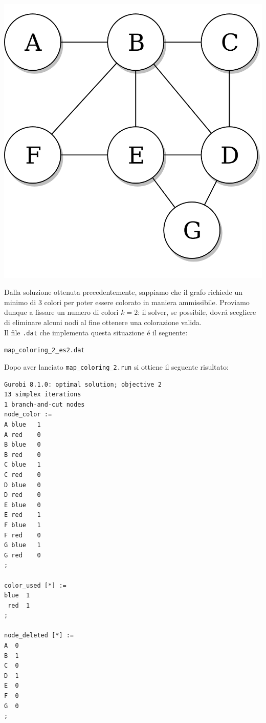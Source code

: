 \documentclass{article}
\begin{document}
\begin{center}
\includegraphics[scale=0.2]{non_complete_graph.png}
\end{center}

Dalla soluzione ottenuta precedentemente, sappiamo che il grafo richiede un minimo di 3 colori per poter essere colorato in maniera ammissibile. Proviamo dunque a fissare un numero di colori $k = 2$: il solver, se possibile, dovr\'a scegliere di eliminare alcuni nodi al fine ottenere una colorazione valida.\\

Il file \texttt{.dat} che implementa questa situazione \'e il seguente:

\vspace{5mm}
\texttt{map\_coloring\_2\_es2.dat}

\vspace{5mm}

Dopo aver lanciato \texttt{map\_coloring\_2.run} si ottiene il seguente risultato:\\

\begin{verbatim}
Gurobi 8.1.0: optimal solution; objective 2
13 simplex iterations
1 branch-and-cut nodes
node_color :=
A blue   1
A red    0
B blue   0
B red    0
C blue   1
C red    0
D blue   0
D red    0
E blue   0
E red    1
F blue   1
F red    0
G blue   1
G red    0
;

color_used [*] :=
blue  1
 red  1
;

node_deleted [*] :=
A  0
B  1
C  0
D  1
E  0
F  0
G  0
;

\end{verbatim}
\end{document}
